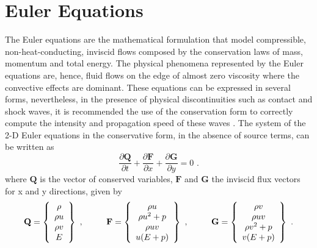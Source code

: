 \section{Euler Equations}
The Euler equations are the mathematical formulation that model compressible, non-heat-conducting, inviscid flows composed by the conservation laws of mass, momentum and total energy. The physical phenomena represented by the Euler equations are, hence, fluid flows on the edge of almost zero viscosity where the convective effects are dominant. These equations can be expressed in several forms, nevertheless, in the presence of physical discontinuities such as contact and shock waves, it is recommended the use of the conservation form to correctly compute the intensity and propagation speed of these waves \cite{Hirsch1991}. The system of the 2-D Euler equations in the conservative form, in the absence of source terms, can be written as
%
\begin{equation} \label{eq:eq_euler}
    \frac{\partial \textbf{Q}}{\partial t} + \frac{\partial \textbf{F}}{\partial x} + \frac{\partial \textbf{G}}{\partial y} = 0
    \mbox{ .}
\end{equation}
%
where $\textbf{Q}$ is the vector of conserved variables, $\textbf{F}$ and $\textbf{G}$ the inviscid flux vectors for x and y directions, given by 
%
\begin{equation}
    \label{eq:eq_euler_defs}
    \textbf{Q} = \left\{ \begin{array}{c} \rho \\ \rho u \\ \rho v \\ E
    \end{array} \right\} \mbox{ ,} \hspace*{1.0 cm}
    \textbf{F} = \left\{ \begin{array}{c} \rho u \\ \rho u^2 + p \\ \rho uv \\ u(E + p)
    \end{array} \right\} \mbox{ ,} \hspace*{1.0 cm}
    \textbf{G} = \left\{ \begin{array}{c} \rho v \\ \rho uv \\ \rho v^2 + p \\ v(E + p)
    \end{array} \right\} \mbox{ .}
\end{equation}

